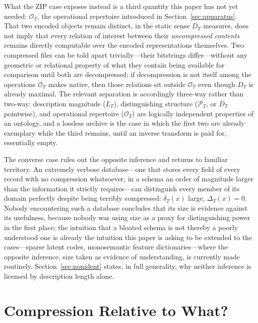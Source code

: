 \documentclass[11pt]{article}
\theoremstyle{plain}
\begin{document}
What the ZIP case exposes instead is a third quantity this paper has not yet needed: $\mathcal{O}_T$, the operational repertoire introduced in Section~\ref{sec:apparatus}. That two encoded objects remain distinct, in the static sense $D_T$ measures, does not imply that every relation of interest between their \emph{uncompressed contents} remains directly computable over the encoded representations themselves. Two compressed files can be told apart trivially---their bitstrings differ---without any geometric or relational property of what they contain being available for comparison until both are decompressed; if decompression is not itself among the operations $\mathcal{O}_T$ makes native, then those relations sit outside $\mathcal{O}_T$ even though $D_T$ is already maximal. The relevant separation is accordingly three-way rather than two-way: description magnitude ($L_T$), distinguishing structure ($\mathcal{P}_T$, or $D_T$ pointwise), and operational repertoire ($\mathcal{O}_T$) are logically independent properties of an ontology, and a lossless archive is the case in which the first two are already exemplary while the third remains, until an inverse transform is paid for, essentially empty.

The converse case rules out the opposite inference and returns to familiar territory. An extremely verbose database---one that stores every field of every record with no compression whatsoever, in a schema an order of magnitude larger than the information it strictly requires---can distinguish every member of its domain perfectly despite being terribly compressed: $\delta_T(x)$ large, $\Delta_T(x) = 0$. Nobody encountering such a database concludes that its size is evidence against its usefulness, because nobody was using size as a proxy for distinguishing power in the first place; the intuition that a bloated schema is not thereby a poorly understood one is already the intuition this paper is asking to be extended to the cases---sparse latent codes, monosemantic feature dictionaries---where the opposite inference, size taken as evidence of understanding, is currently made routinely. Section~\ref{sec:nonident} states, in full generality, why neither inference is licensed by description length alone.

\section{Compression Relative to What?}
\label{sec:relative}
\end{document}

